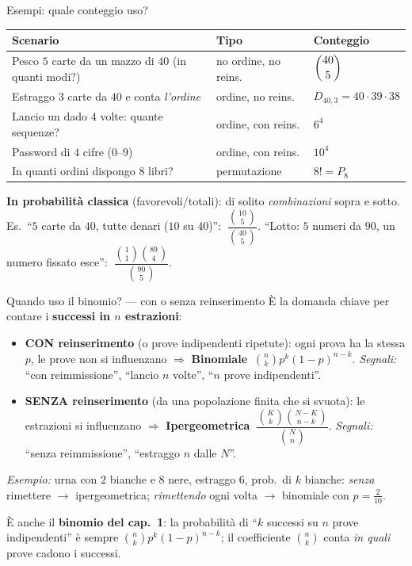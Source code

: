 \documentclass[11pt]{article}
\begin{document}
\begin{concetto}[barSlate]{Esempi: quale conteggio uso?}
\renewcommand{\arraystretch}{1.5}
\begin{center}
\begin{tabular}{p{7.1cm}p{2.2cm}l}
\hline
Scenario & Tipo & Conteggio \\
\hline
Pesco $5$ carte da un mazzo di $40$ (in quanti modi?) & no ordine, no reins. & $\dbinom{40}{5}$ \\
Estraggo $3$ carte da $40$ e conta \emph{l'ordine} & ordine, no reins. & $D_{40,3}=40\cdot39\cdot38$ \\
Lancio un dado $4$ volte: quante sequenze? & ordine, con reins. & $6^4$ \\
Password di $4$ cifre ($0$--$9$) & ordine, con reins. & $10^4$ \\
In quanti ordini dispongo $8$ libri? & permutazione & $8! = P_8$ \\
\hline
\end{tabular}
\end{center}
\renewcommand{\arraystretch}{1}

\textbf{In probabilit\`a classica} (favorevoli/totali): di solito \emph{combinazioni} sopra e sotto. Es.\ ``$5$ carte da $40$, tutte denari ($10$ su $40$)'': $\ \dfrac{\binom{10}{5}}{\binom{40}{5}}$. \; ``Lotto: $5$ numeri da $90$, un numero fissato esce'': $\ \dfrac{\binom{1}{1}\binom{89}{4}}{\binom{90}{5}}$.
\end{concetto}

\begin{concetto}[barSlate]{Quando uso il binomio? --- con o senza reinserimento}
\`E la domanda chiave per contare i \textbf{successi in $n$ estrazioni}:
\begin{itemize}[leftmargin=1.2em,itemsep=3pt,topsep=2pt]
\item \textbf{CON reinserimento} (o prove indipendenti ripetute): ogni prova ha la stessa $p$, le prove non si influenzano $\Rightarrow$ \textbf{Binomiale} $\ \binom{n}{k}p^k(1-p)^{n-k}$. \; \emph{Segnali:} ``con reimmissione'', ``lancio $n$ volte'', ``$n$ prove indipendenti''.
\item \textbf{SENZA reinserimento} (da una popolazione finita che si svuota): le estrazioni si influenzano $\Rightarrow$ \textbf{Ipergeometrica} $\ \dfrac{\binom{K}{k}\binom{N-K}{n-k}}{\binom{N}{n}}$. \; \emph{Segnali:} ``senza reimmissione'', ``estraggo $n$ dalle $N$''.
\end{itemize}
\emph{Esempio:} urna con $2$ bianche e $8$ nere, estraggo $6$, prob.\ di $k$ bianche: \emph{senza} rimettere $\to$ ipergeometrica; \emph{rimettendo} ogni volta $\to$ binomiale con $p=\tfrac{2}{10}$.

\`E anche il \textbf{binomio del cap.\ 1}: la probabilit\`a di ``$k$ successi su $n$ prove indipendenti'' \`e sempre $\binom{n}{k}p^k(1-p)^{n-k}$; il coefficiente $\binom{n}{k}$ conta \emph{in quali} prove cadono i successi.
\end{concetto}
\end{document}
